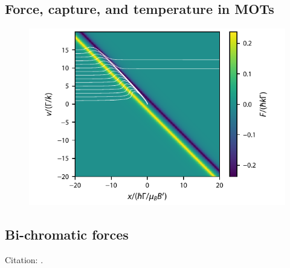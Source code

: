 \documentclass[final,5p,times,twocolumn]{elsarticle}
\begin{document}
\subsection{Force, capture, and temperature in MOTs}

\begin{figure}
	\center
	\includegraphics{figs/F0_to_F1_MOT_force_with_incoming_trajectories.pdf}
	\caption{\label{fig:mot_forces}}
\end{figure}


\subsection{Bi-chromatic forces}
Citation: \cite{Soding1997}.














\end{document}
